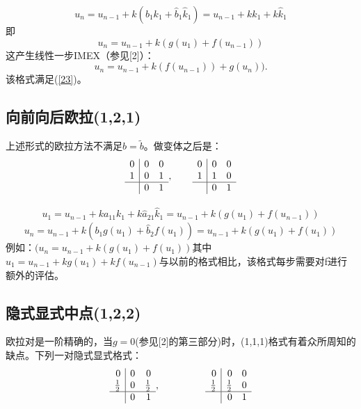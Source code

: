 \documentclass[12pt,a4paper]{article}
\begin{document}
\begin{equation*}
u_{n}=u_{n-1}+k(b_{1}k_{1}+\hat{b}_{1}\hat{k}_{1})=u_{n-1}+kk_{1}+k\hat{k}_{1}
\end{equation*}
即
\begin{equation*}
u_{n}=u_{n-1}+k(g(u_{1})+f(u_{n-1}))
\end{equation*}
这产生线性一步IMEX（参见[2]）：
\begin{equation}
u_{n}=u_{n-1}+k(f(u_{n-1}))+g(u_{n})).
\end{equation}
该格式满足(\ref{23})。

\subsection{向前向后欧拉(1,2,1)}

上述形式的欧拉方法不满足$\widehat{b}=\tilde{b}$。做变体之后是：
\[
\begin{array}{r|rr}
0 & 0 & 0\\
1 & 0 & 1 \\
\hline
& 0 & 1
\end{array},~~~~~~
\begin{array}{r|rr}
0 & 0 & 0\\
1 & 1 & 0 \\
\hline
& 0 & 1
\end{array}
\]

\begin{gather}
u_{1}=u_{n-1}+ka_{11}k_{1}+k\hat{a}_{21}\hat{k}_{1}=u_{n-1}+k(g(u_{1})+f(u_{n-1}))
\end{gather}
\begin{equation*}
u_{n}=u_{n-1}+k(b_{1}g(u_{1})+\hat{b}_{2}f(u_{1}))=u_{n-1}+k(g(u_{1})+f(u_{1}))
\end{equation*}
例如：$(u_{n}=u_{n-1}+k(g(u_{1})+f(u_{1}))$其中$u_{1}=u_{n-1}+kg(u_{1})+kf(u_{n-1})$与以前的格式相比，该格式每步需要对f进行额外的评估。

\subsection{隐式显式中点(1,2,2)}
欧拉对是一阶精确的，当$g=0$(参见[2]的第三部分)时，(1,1,1)格式有着众所周知的缺点。下列一对隐式显式格式：
\[
\begin{array}{r|rr}
0 & 0 & 0\\
\frac{1}{2} & 0 & \frac{1}{2}\\
\hline
& 0 & 1
\end{array},~~~~~~~~~~~~~~
\begin{array}{r|rr}
0 & 0 & 0\\
\frac{1}{2} & \frac{1}{2} & 0\\
\hline
& 0 & 1
\end{array}
\]
\end{document}
